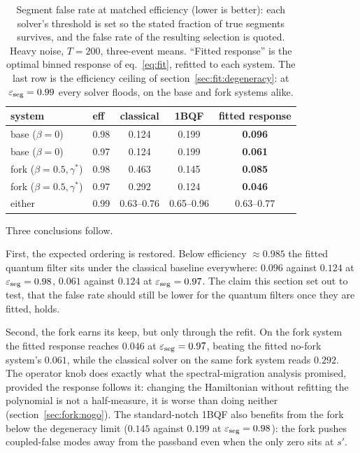 \documentclass[11pt,a4paper]{article}
\newcommand{\eff}{\ensuremath{\varepsilon_{\rm seg}}}
\begin{document}
\begin{table}[H]
\centering
\begin{tabular}{llccc}
\toprule
system & eff & classical & 1BQF & \textbf{fitted response}\\
\midrule
base ($\beta=0$)        & 0.98 & 0.124 & 0.199 & \textbf{0.096}\\
base ($\beta=0$)        & 0.97 & 0.124 & 0.199 & \textbf{0.061}\\
fork ($\beta=0.5,\gamma^*$) & 0.98 & 0.463 & 0.145 & \textbf{0.085}\\
fork ($\beta=0.5,\gamma^*$) & 0.97 & 0.292 & 0.124 & \textbf{0.046}\\
\midrule
either              & 0.99 & 0.63--0.76 & 0.65--0.96 & 0.63--0.77\\
\bottomrule
\end{tabular}
\caption{Segment false rate at matched efficiency (lower is better):
each solver's threshold is set so the stated fraction of true
segments survives, and the false rate of the resulting selection is
quoted. Heavy noise, $T=200$, three-event means. ``Fitted response''
is the optimal binned response of eq.~\eqref{eq:fit}, refitted to
each system. The last row is the efficiency ceiling of
section~\ref{sec:fit:degeneracy}: at $\eff=0.99$ every solver floods, on
the base and fork systems alike.}
\label{tab:fit}
\end{table}

Three conclusions follow.

First, the expected ordering is restored. Below efficiency
$\approx0.985$ the fitted quantum filter sits under the classical
baseline everywhere: $0.096$ against $0.124$ at $\eff=0.98$, $0.061$
against $0.124$ at $\eff=0.97$. The claim this section set out to
test, that the false rate should still be lower for the quantum
filters once they are fitted, holds.

Second, the fork earns its keep, but only through the refit. On the
fork system the fitted response
reaches $0.046$ at $\eff=0.97$, beating the fitted no-fork system's
$0.061$, while the classical solver on the same fork system reads
$0.292$. The operator knob does exactly what the spectral-migration
analysis promised, provided the response follows it: changing the
Hamiltonian without refitting the polynomial is not a half-measure,
it is worse than doing neither
(section~\ref{sec:fork:nogo}). The standard-notch 1BQF also benefits
from the fork
below the degeneracy limit ($0.145$ against $0.199$ at $\eff=0.98$): the fork
pushes coupled-false modes away from the passband even when the
only zero sits at $s'$.
\end{document}

